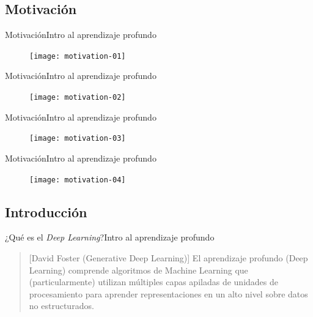 \documentclass[10pt,border=3pt,tikz]{beamer}
\begin{document}
    \subsection{Motivación}
    
    \begin{frame}{Motivación}{Intro al aprendizaje profundo}
        \begin{figure}
            \centering
            \texttt{[image: motivation-01]}
        \end{figure}
    \end{frame}
    
    \begin{frame}{Motivación}{Intro al aprendizaje profundo}
        \begin{figure}
            \centering
            \texttt{[image: motivation-02]}
        \end{figure}
    \end{frame}
    
    \begin{frame}{Motivación}{Intro al aprendizaje profundo}
        \begin{figure}
            \centering
            \texttt{[image: motivation-03]}
        \end{figure}
    \end{frame}

    \begin{frame}{Motivación}{Intro al aprendizaje profundo}
        \begin{figure}
            \centering
            \texttt{[image: motivation-04]}
        \end{figure}
    \end{frame}
    
    \subsection{Introducción}
    
    \begin{frame}{¿Qué es el \textsl{Deep Learning}?}{Intro al aprendizaje profundo}
        \begin{quotation}[David Foster (Generative Deep Learning)]
            El aprendizaje profundo (Deep Learning) comprende algoritmos de Machine Learning que (particularmente) utilizan múltiples capas apiladas de unidades de procesamiento para aprender representaciones en un alto nivel sobre datos no estructurados.
        \end{quotation}
    \end{frame}
    
\end{document}
